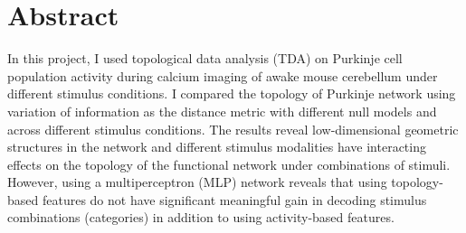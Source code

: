\section{Abstract}

In this project, I used topological data analysis (TDA) on Purkinje cell population activity during calcium imaging of awake mouse cerebellum under different stimulus conditions. I compared the topology of Purkinje network using variation of information as the distance metric with different null models and across different stimulus conditions. The results reveal low-dimensional geometric structures in the network and different stimulus modalities have interacting effects on the topology of the functional network under combinations of stimuli. However, using a multiperceptron (MLP) network reveals that using topology-based features do not have significant meaningful gain in decoding stimulus combinations (categories) in addition to using activity-based features.